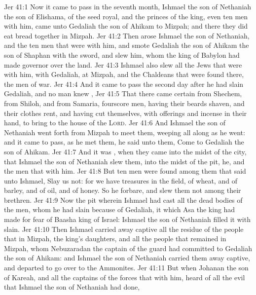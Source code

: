 \vs Jer 41:1 Now it came to pass in the seventh month,  Ishmael the son of Nethaniah the son of Elishama, of the seed royal, and the princes of the king, even ten men with him, came unto Gedaliah the son of Ahikam to Mizpah; and there they did eat bread together in Mizpah.
\vs Jer 41:2 Then arose Ishmael the son of Nethaniah, and the ten men that were with him, and smote Gedaliah the son of Ahikam the son of Shaphan with the sword, and slew him, whom the king of Babylon had made governor over the land.
\vs Jer 41:3 Ishmael also slew all the Jews that were with him,  with Gedaliah, at Mizpah, and the Chaldeans that were found there,  the men of war.
\vs Jer 41:4 And it came to pass the second day after he had slain Gedaliah, and no man knew ,
\vs Jer 41:5 That there came certain from Shechem, from Shiloh, and from Samaria,  fourscore men, having their beards shaven, and their clothes rent, and having cut themselves, with offerings and incense in their hand, to bring  to the house of the \textsc{Lord}.
\vs Jer 41:6 And Ishmael the son of Nethaniah went forth from Mizpah to meet them, weeping all along as he went: and it came to pass, as he met them, he said unto them, Come to Gedaliah the son of Ahikam.
\vs Jer 41:7 And it was , when they came into the midst of the city, that Ishmael the son of Nethaniah slew them,  into the midst of the pit, he, and the men that  with him.
\vs Jer 41:8 But ten men were found among them that said unto Ishmael, Slay us not: for we have treasures in the field, of wheat, and of barley, and of oil, and of honey. So he forbare, and slew them not among their brethren.
\vs Jer 41:9 Now the pit wherein Ishmael had cast all the dead bodies of the men, whom he had slain because of Gedaliah,  it which Asa the king had made for fear of Baasha king of Israel:  Ishmael the son of Nethaniah filled it with  slain.
\vs Jer 41:10 Then Ishmael carried away captive all the residue of the people that  in Mizpah,  the king's daughters, and all the people that remained in Mizpah, whom Nebuzaradan the captain of the guard had committed to Gedaliah the son of Ahikam: and Ishmael the son of Nethaniah carried them away captive, and departed to go over to the Ammonites.
\vs Jer 41:11 But when Johanan the son of Kareah, and all the captains of the forces that  with him, heard of all the evil that Ishmael the son of Nethaniah had done,
